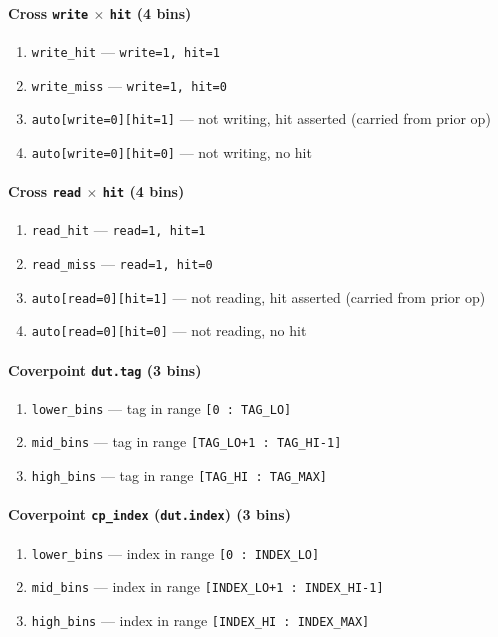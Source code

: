 \documentclass[11pt]{article}
\begin{document}
\paragraph*{Cross \texttt{write} $\times$ \texttt{hit} (4 bins)}
\begin{enumerate}[resume, label=\arabic*.]
  \item \texttt{write\_hit} --- \texttt{write=1, hit=1}
  \item \texttt{write\_miss} --- \texttt{write=1, hit=0}
  \item \texttt{auto[write=0][hit=1]} --- not writing, hit asserted (carried from prior op)
  \item \texttt{auto[write=0][hit=0]} --- not writing, no hit
\end{enumerate}

\paragraph*{Cross \texttt{read} $\times$ \texttt{hit} (4 bins)}
\begin{enumerate}[resume, label=\arabic*.]
  \item \texttt{read\_hit} --- \texttt{read=1, hit=1}
  \item \texttt{read\_miss} --- \texttt{read=1, hit=0}
  \item \texttt{auto[read=0][hit=1]} --- not reading, hit asserted (carried from prior op)
  \item \texttt{auto[read=0][hit=0]} --- not reading, no hit
\end{enumerate}

\paragraph*{Coverpoint \texttt{dut.tag} (3 bins)}
\begin{enumerate}[resume, label=\arabic*.]
  \item \texttt{lower\_bins} --- tag in range \texttt{[0 : TAG\_LO]}
  \item \texttt{mid\_bins} --- tag in range \texttt{[TAG\_LO+1 : TAG\_HI-1]}
  \item \texttt{high\_bins} --- tag in range \texttt{[TAG\_HI : TAG\_MAX]}
\end{enumerate}

\paragraph*{Coverpoint \texttt{cp\_index} (\texttt{dut.index}) (3 bins)}
\begin{enumerate}[resume, label=\arabic*.]
  \item \texttt{lower\_bins} --- index in range \texttt{[0 : INDEX\_LO]}
  \item \texttt{mid\_bins} --- index in range \texttt{[INDEX\_LO+1 : INDEX\_HI-1]}
  \item \texttt{high\_bins} --- index in range \texttt{[INDEX\_HI : INDEX\_MAX]}
\end{enumerate}
\end{document}
